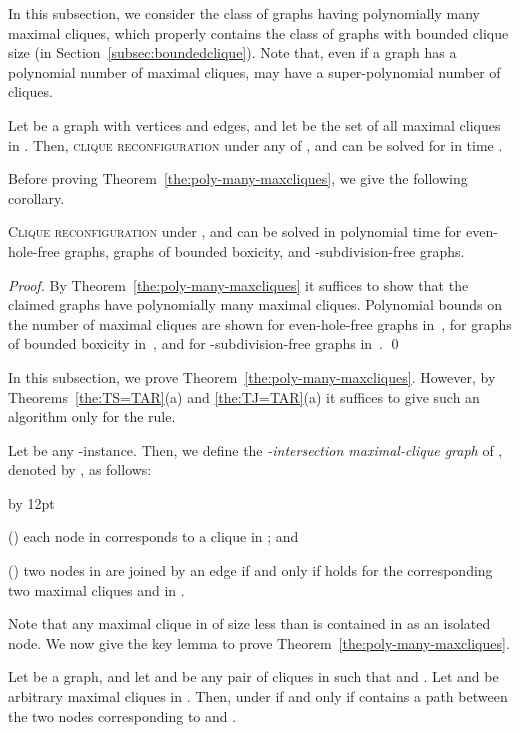 \documentclass{llncs}
\newenvironment{listing}[1]{\begin{list}{*}{\settowidth{\labelwidth}{#1}\setlength{\leftmargin}{\labelwidth}\advance \leftmargin by 12pt
\setlength{\itemsep}{0pt}\setlength{\parsep}{0pt}\setlength{\topsep}{0pt}\setlength{\parskip}{0pt}}}{\end{list}}
\newcounter{one}
\newcommand{\one}{{\rm \roman{one}}}
\newcounter{two}
\newcommand{\two}{{\rm \roman{two}}}
\begin{document}
	In this subsection, we consider the class of graphs having polynomially many maximal cliques, which properly contains the class of graphs with bounded clique size (in Section~\ref{subsec:boundedclique}). 
	Note that, even if a graph  has a polynomial number of maximal cliques,  may have a super-polynomial number of cliques. 
\begin{theorem} \label{the:poly-many-maxcliques}
	Let  be a graph with  vertices and  edges, and let  be the set of all maximal cliques in . 
	Then, \textsc{clique reconfiguration} under any of ,  and  can be solved for  in time .
	\end{theorem}

	Before proving Theorem~\ref{the:poly-many-maxcliques}, we give the following corollary.
	\begin{corollary} \label{cor:maximal}
	\textsc{Clique reconfiguration} under ,  and  can be solved in polynomial time for even-hole-free graphs, graphs of bounded boxicity, and -subdivision-free graphs.
	\end{corollary}
	\begin{proof}
	By Theorem~\ref{the:poly-many-maxcliques} it suffices to show that the claimed graphs have polynomially many maximal cliques.
	Polynomial bounds on the number of maximal cliques are shown
for even-hole-free graphs in~\cite{SilvaV07},
for graphs of bounded boxicity in~\cite{Spinrad03},
and for -subdivision-free graphs in~\cite{LeeO14}.
	\qed
	\end{proof}


	In this subsection, we prove Theorem~\ref{the:poly-many-maxcliques}. 
	However, by Theorems~\ref{the:TS=TAR}(a) and \ref{the:TJ=TAR}(a) it suffices to give such an algorithm only for the  rule.

	Let  be any -instance.
	Then, we define the \emph{-intersection maximal-clique graph} of , denoted by , as follows:
		\begin{listing}{aaa}
		\item[(\one)] each node in  corresponds to a clique in ; and 
		\item[(\two)] two nodes in  are joined by an edge if and only if  holds for the corresponding two maximal cliques  and  in .  
		\end{listing}
	Note that any maximal clique in  of size less than  is contained in  as an isolated node.
	We now give the key lemma to prove Theorem~\ref{the:poly-many-maxcliques}.
	\begin{lemma} \label{lem:clique-path}
	Let  be a graph, and let  and  be any pair of cliques in  such that  and .
	Let  and  be arbitrary maximal cliques in .
	Then,  under  if and only if  contains a path between the two nodes corresponding to  and .
	\end{lemma}
\end{document}
